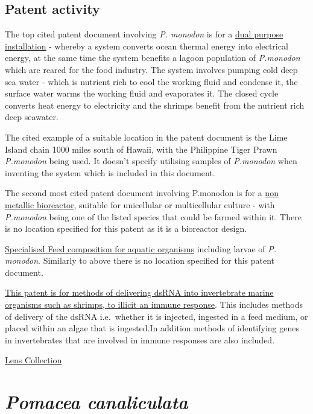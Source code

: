 \documentclass[]{book}
\theoremstyle{definition}
\theoremstyle{definition}
\theoremstyle{definition}
\theoremstyle{remark}
\begin{document}
\hypertarget{patent-activity-6}{%
\subsection{Patent activity}\label{patent-activity-6}}

The top cited patent document involving \emph{P. monodon} is for a
\href{https://www.lens.org/lens/patent/US_4055145_A}{dual purpose
installation} - whereby a system converts ocean thermal energy into
electrical energy, at the same time the system benefits a lagoon
population of \emph{P.monodon} which are reared for the food industry.
The system involves pumping cold deep sea water - which is nutrient rich
to cool the working fluid and condense it, the surface water warms the
working fluid and evaporates it. The closed cycle converts heat energy
to electricity and the shrimps benefit from the nutrient rich deep
seawater.

The cited example of a suitable location in the patent document is the
Lime Island chain 1000 miles south of Hawaii, with the Philippine Tiger
Prawn \emph{P.monodon} being used. It doesn't specify utilising samples
of \emph{P.monodon} when inventing the system which is included in this
document.

The second most cited patent document involving P.monodon is for a
\href{https://www.lens.org/lens/patent/US_6571735_B1}{non metallic
bioreactor}, suitable for unicellular or multicellular culture - with
\emph{P.monodon} being one of the listed species that could be farmed
within it. There is no location specified for this patent as it is a
bioreactor design.

\href{https://www.lens.org/lens/patent/WO_2008_084074_A2}{Specialised
Feed composition for aquatic organisms} including larvae of \emph{P.
monodon}. Similarly to above there is no location specified for this
patent document.

\href{https://www.lens.org/lens/patent/US_2005_0080032_A1}{This patent
is for methods of delivering dsRNA into invertebrate marine organisms
such as shrimps, to illicit an immune response}. This includes methods
of delivery of the dsRNA i.e.~whether it is injected, ingested in a feed
medium, or placed within an algae that is ingested.In addition methods
of identifying genes in invertebrates that are involved in immune
responses are also included.

\href{https://www.lens.org/lens/collection/24679}{Lens Collection}

\hypertarget{pomacea-canaliculata}{%
\section{\texorpdfstring{\emph{Pomacea
canaliculata}}{Pomacea canaliculata}}\label{pomacea-canaliculata}}
\end{document}
